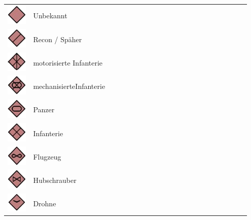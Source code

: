 \begin{longtable}{C{0.1\linewidth} m{0.85\linewidth}}
	\includegraphics[scale=0.8]{../img/advanced/kartenarbeit/Unbekannt.png}	& 	Unbekannt \\
	\includegraphics[scale=0.8]{../img/advanced/kartenarbeit/Recon.png}	& 	Recon / Späher \\
	\includegraphics[scale=0.8]{../img/advanced/kartenarbeit/motorisierteInfanterie.png}	& 	motorisierte Infanterie \\
	\includegraphics[scale=0.8]{../img/advanced/kartenarbeit/mechanisierteInfanterie.png}	& 	mechanisierteInfanterie\\
	\includegraphics[scale=0.8]{../img/advanced/kartenarbeit/Panzer.png}	& 	Panzer \\
	\includegraphics[scale=0.8]{../img/advanced/kartenarbeit/Infanterie.png}	& 	Infanterie \\
	\includegraphics[scale=0.8]{../img/advanced/kartenarbeit/Flugzeug.png}	& 	Flugzeug \\
	\includegraphics[scale=0.8]{../img/advanced/kartenarbeit/Hubschrauber.png}	&	 Hubschrauber \\
	\includegraphics[scale=0.8]{../img/advanced/kartenarbeit/Drohne.png}	& 	Drohne \\
\end{longtable}